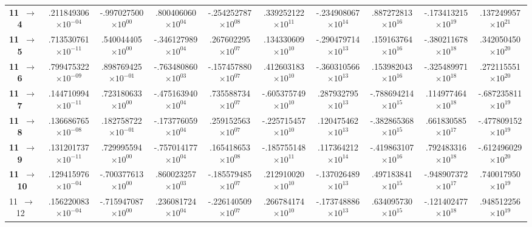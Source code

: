 \documentclass[reviewcopy]{elsarticle}
\begin{document}
\begin{landscape}
\begin{longtable}{lccccccccc}
{\bf 11~$\to$~ 4}   &   .211849306$\times10^{-04}$ & -.997027500$\times10^{ 00}$ &  .800406060$\times10^{ 04}$ & -.254252787$\times10^{ 08}$ &  .339252122$\times10^{ 11}$ & -.234908067$\times10^{ 14}$ &  .887272813$\times10^{ 16}$ & -.173413215$\times10^{ 19}$ &  .137249957$\times10^{ 21}$ \\
{\bf 11~$\to$~ 5}   &   .713530761$\times10^{-11}$ &  .540044405$\times10^{ 00}$ & -.346127989$\times10^{ 04}$ &  .267602295$\times10^{ 07}$ &  .134330609$\times10^{ 10}$ & -.290479714$\times10^{ 13}$ &  .159163764$\times10^{ 16}$ & -.380211678$\times10^{ 18}$ &  .342050450$\times10^{ 20}$ \\
{\bf 11~$\to$~ 6}   &   .799475322$\times10^{-09}$ &  .898769425$\times10^{-01}$ & -.763480860$\times10^{ 03}$ & -.157457880$\times10^{ 07}$ &  .412603183$\times10^{ 10}$ & -.360310566$\times10^{ 13}$ &  .153982043$\times10^{ 16}$ & -.325489971$\times10^{ 18}$ &  .272115551$\times10^{ 20}$ \\
{\bf 11~$\to$~ 7}   &   .144710994$\times10^{-11}$ &  .723180633$\times10^{ 00}$ & -.475163940$\times10^{ 04}$ &  .735588734$\times10^{ 07}$ & -.605375749$\times10^{ 10}$ &  .287932795$\times10^{ 13}$ & -.788694214$\times10^{ 15}$ &  .114977464$\times10^{ 18}$ & -.687235811$\times10^{ 19}$ \\
{\bf 11~$\to$~ 8}   &   .136686765$\times10^{-08}$ &  .182758722$\times10^{-01}$ & -.173776059$\times10^{ 04}$ &  .259152563$\times10^{ 07}$ & -.225715457$\times10^{ 10}$ &  .120475462$\times10^{ 13}$ & -.382865368$\times10^{ 15}$ &  .661830585$\times10^{ 17}$ & -.477809152$\times10^{ 19}$ \\
{\bf 11~$\to$~ 9}   &   .131201737$\times10^{-11}$ &  .729995594$\times10^{ 00}$ & -.757014177$\times10^{ 04}$ &  .165418653$\times10^{ 08}$ & -.185755148$\times10^{ 11}$ &  .117364212$\times10^{ 14}$ & -.419863107$\times10^{ 16}$ &  .792483316$\times10^{ 18}$ & -.612496029$\times10^{ 20}$ \\
{\bf 11~$\to$~ 10}  &   .129415976$\times10^{-04}$ & -.700377613$\times10^{ 00}$ &  .860023257$\times10^{ 03}$ & -.185579485$\times10^{ 07}$ &  .212910020$\times10^{ 10}$ & -.137026489$\times10^{ 13}$ &  .497183841$\times10^{ 15}$ & -.948907372$\times10^{ 17}$ &  .740017950$\times10^{ 19}$ \\
 11~$\to$~ 12  &   .156220083$\times10^{-04}$ & -.715947087$\times10^{ 00}$ &  .236081724$\times10^{ 04}$ & -.226140509$\times10^{ 07}$ &  .266784174$\times10^{ 10}$ & -.173748886$\times10^{ 13}$ &  .634095730$\times10^{ 15}$ & -.121402477$\times10^{ 18}$ &  .948512256$\times10^{ 19}$ \\

\end{longtable}
\end{landscape}
\end{document}
